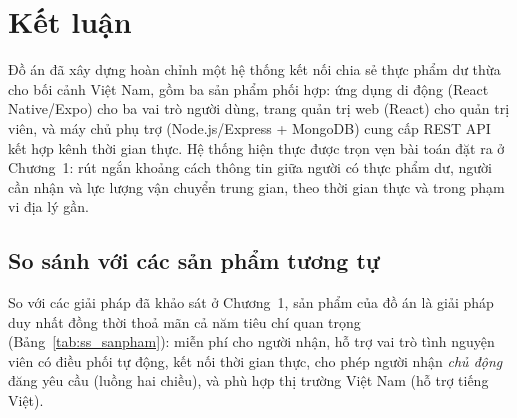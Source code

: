 \documentclass[../main.tex]{subfiles}%
\begin{document}
\setcounter{chapter}{6}

\section{Kết luận}
\label{section:6.1}

Đồ án đã xây dựng hoàn chỉnh một hệ thống kết nối chia sẻ thực phẩm dư thừa cho bối cảnh Việt Nam, gồm ba sản phẩm phối hợp: ứng dụng di động (React Native/Expo) cho ba vai trò người dùng, trang quản trị web (React) cho quản trị viên, và máy chủ phụ trợ (Node.js/Express + MongoDB) cung cấp REST API kết hợp kênh thời gian thực. Hệ thống hiện thực được trọn vẹn bài toán đặt ra ở Chương~1: rút ngắn khoảng cách thông tin giữa người có thực phẩm dư, người cần nhận và lực lượng vận chuyển trung gian, theo thời gian thực và trong phạm vi địa lý gần.

\subsection{So sánh với các sản phẩm tương tự}
\label{subsection:6.1.1}

So với các giải pháp đã khảo sát ở Chương~1, sản phẩm của đồ án là giải pháp duy nhất đồng thời thoả mãn cả năm tiêu chí quan trọng (Bảng~\ref{tab:ss_sanpham}): miễn phí cho người nhận, hỗ trợ vai trò tình nguyện viên có điều phối tự động, kết nối thời gian thực, cho phép người nhận \textit{chủ động} đăng yêu cầu (luồng hai chiều), và phù hợp thị trường Việt Nam (hỗ trợ tiếng Việt).

\begin{table}[H]
\centering
\renewcommand{\arraystretch}{1.3}
\caption{So sánh sản phẩm đồ án với các giải pháp hiện có}
\label{tab:ss_sanpham}
\end{table}
\end{document}
